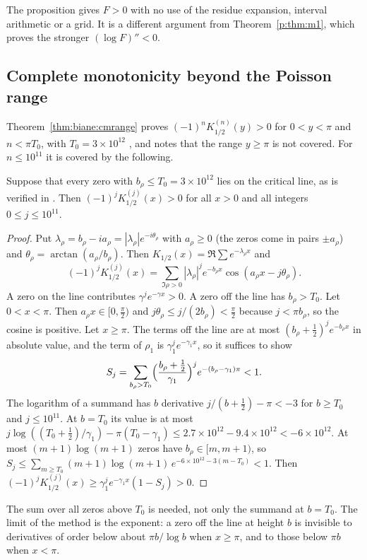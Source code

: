 The proposition gives $F>0$ with no use of the residue expansion, interval arithmetic or a grid. It is a different argument from Theorem~\ref{p:thm:m1}, which proves the stronger $(\log F)''<0$.

\subsection{Complete monotonicity beyond the Poisson range}

Theorem~\ref{thm:biane:cmrange} proves $(-1)^nK_{1/2}^{(n)}(y)>0$ for $0<y<\pi$ and $n<\pi T_0$, with $T_0=3\times10^{12}$ \cite{PT21}, and notes that the range $y\ge\pi$ is not covered. For $n\le10^{11}$ it is covered by the following.

\begin{theorem}\label{p:thm:cm}
Suppose that every zero with $b_\rho\le T_0=3\times10^{12}$ lies on the critical line, as is verified in \cite{PT21}. Then $(-1)^jK_{1/2}^{(j)}(x)>0$ for all $x>0$ and all integers $0\le j\le10^{11}$.
\end{theorem}

\begin{proof}
Put $\lambda_\rho=b_\rho-ia_\rho=|\lambda_\rho|e^{-i\theta_\rho}$ with $a_\rho\ge0$ (the zeros come in pairs $\pm a_\rho$) and $\theta_\rho=\arctan(a_\rho/b_\rho)$. Then $K_{1/2}(x)=\Re\sum e^{-\lambda_\rho x}$ and
\[
(-1)^jK_{1/2}^{(j)}(x)=\sum_{\Im\rho>0}|\lambda_\rho|^je^{-b_\rho x}\cos(a_\rho x-j\theta_\rho).
\]
A zero on the line contributes $\gamma^je^{-\gamma x}>0$. A zero off the line has $b_\rho>T_0$. Let $0<x<\pi$. Then $a_\rho x\in[0,\frac\pi2)$ and $j\theta_\rho\le j/(2b_\rho)<\frac\pi2$ because $j<\pi b_\rho$, so the cosine is positive. Let $x\ge\pi$. The terms off the line are at most $(b_\rho+\frac12)^je^{-b_\rho x}$ in absolute value, and the term of $\rho_1$ is $\gamma_1^je^{-\gamma_1x}$, so it suffices to show
\[
S_j=\sum_{b_\rho>T_0}\Bigl(\frac{b_\rho+\frac12}{\gamma_1}\Bigr)^je^{-(b_\rho-\gamma_1)\pi}<1.
\]
The logarithm of a summand has $b$ derivative $j/(b+\frac12)-\pi<-3$ for $b\ge T_0$ and $j\le10^{11}$. At $b=T_0$ its value is at most $j\log((T_0+\frac12)/\gamma_1)-\pi(T_0-\gamma_1)\le2.7\times10^{12}-9.4\times10^{12}<-6\times10^{12}$. At most $(m+1)\log(m+1)$ zeros have $b_\rho\in[m,m+1)$, so $S_j\le\sum_{m\ge T_0}(m+1)\log(m+1)\,e^{-6\times10^{12}-3(m-T_0)}<1$. Then $(-1)^jK_{1/2}^{(j)}(x)\ge\gamma_1^je^{-\gamma_1x}(1-S_j)>0$.
\end{proof}

The sum over all zeros above $T_0$ is needed, not only the summand at $b=T_0$. The limit of the method is the exponent: a zero off the line at height $b$ is invisible to derivatives of order below about $\pi b/\log b$ when $x\ge\pi$, and to those below $\pi b$ when $x<\pi$.

